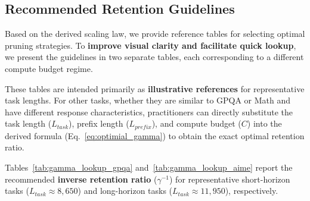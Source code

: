 \documentclass[11pt]{article}
\theoremstyle{plain}
\begin{document}
\subsection{Recommended Retention Guidelines}
\label{app:gamma_guidelines}

Based on the derived scaling law, we provide reference tables for selecting optimal pruning strategies. To \textbf{improve visual clarity and facilitate quick lookup}, we present the guidelines in two separate tables, each corresponding to a different compute budget regime.

These tables are intended primarily as \textbf{illustrative references} for representative task lengths. For other tasks, whether they are similar to GPQA or Math and have different response characteristics, practitioners can directly substitute the task length ($L_{task}$), prefix length ($L_{prefix}$), and compute budget ($C$) into the derived formula (Eq.~\ref{eq:optimial_gamma}) to obtain the exact optimal retention ratio.

Tables~\ref{tab:gamma_lookup_gpqa} and~\ref{tab:gamma_lookup_aime} report the recommended \textbf{inverse retention ratio} ($\gamma^{-1}$) for representative short-horizon tasks ($L_{task} \approx 8{,}650$) and long-horizon tasks ($L_{task} \approx 11{,}950$), respectively.

    
\end{document}
